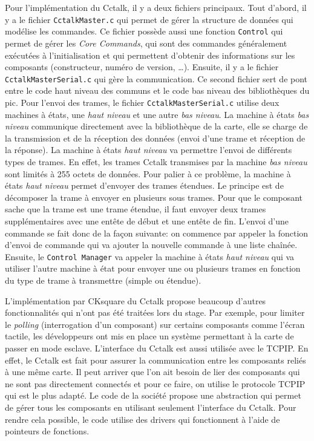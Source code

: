 \documentclass[a4paper]{article}
\begin{document}
Pour l'implémentation du Cctalk, il y a deux fichiers principaux. Tout d'abord,
il y a le fichier \verb|CctalkMaster.c| qui permet de gérer la structure de
données qui modélise les commandes. Ce fichier possède aussi une fonction
\verb|Control| qui permet de gérer les \textit{Core Commands}, qui sont des
commandes généralement exécutées à l'initialisation et qui permettent d'obtenir
des informations sur les composants (constructeur, numéro de version, \dots).
Ensuite, il y a le fichier \verb|CctalkMasterSerial.c| qui gère la
communication. Ce second fichier sert de pont entre le code haut niveau des
communs et le code bas niveau des bibliothèques du \gls{pic}. Pour l'envoi des
trames, le fichier \verb|CctalkMasterSerial.c| utilise deux machines à états,
une \textit{haut niveau} et une autre \textit{bas niveau}. La machine à états
\textit{bas niveau} communique directement avec la bibliothèque de la carte,
elle se charge de la transmission et de la réception des données (envoi d'une
trame et réception de la réponse). La machine à états \textit{haut niveau} va
permettre l'envoi de différents types de trames. En effet, les trames Cctalk
transmises par la machine \textit{bas niveau} sont limités à 255 octets de
données. Pour palier à ce problème, la machine à états \textit{haut niveau}
permet d'envoyer des trames étendues. Le principe est de décomposer la trame à
envoyer en plusieurs sous trames. Pour que le composant sache que la trame est
une trame étendue, il faut envoyer deux trames supplémentaires avec une entête
de début et une entête de fin. L'envoi d'une commande se fait donc de la façon
suivante: on commence par appeler la fonction d'envoi de commande qui va ajouter
la nouvelle commande à une liste chaînée. Ensuite, le \verb|Control Manager| va
appeler la machine à états \textit{haut niveau} qui va utiliser l'autre machine
à état pour envoyer une ou plusieurs trames en fonction du type de trame à
transmettre (simple ou étendue).

L'implémentation par CKsquare du Cctalk propose beaucoup d'autres
fonctionnalités qui n'ont pas été traitées lors du stage. Par exemple, pour
limiter le \textit{polling} (interrogation d'un composant) sur certains
composants comme l'écran tactile, les développeurs ont mis en place un système
permettant à la carte de passer en mode esclave. L'interface du Cctalk est aussi
utilisée avec le TCPIP. En effet, le Cctalk est fait pour assurer la
communication entre les composants reliés à une même carte. Il peut arriver que
l'on ait besoin de lier des composants qui ne sont pas directement connectés et
pour ce faire, on utilise le protocole TCPIP qui est le plus adapté. Le code de
la société propose une abstraction qui permet de gérer tous les composants en
utilisant seulement l'interface du Cctalk. Pour rendre cela possible, le code
utilise des drivers qui fonctionnent à l'aide de pointeurs de fonctions.
\end{document}
